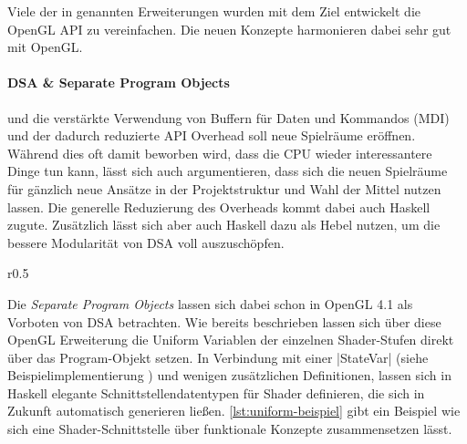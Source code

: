Viele der in  genannten Erweiterungen wurden mit dem Ziel entwickelt die OpenGL API zu vereinfachen. Die neuen Konzepte harmonieren dabei sehr gut mit OpenGL.

\paragraph{\acl{DSA} \& Separate Program Objects} und die verstärkte Verwendung von Buffern für Daten und Kommandos (\ac{MDI}) und der dadurch reduzierte API Overhead soll neue Spielräume eröffnen. Während dies oft damit beworben wird, dass die CPU wieder interessantere Dinge tun kann, lässt sich auch argumentieren, dass sich die neuen Spielräume für gänzlich neue Ansätze in der Projektstruktur und Wahl der Mittel nutzen lassen. Die generelle Reduzierung des Overheads kommt dabei auch Haskell zugute. Zusätzlich lässt sich aber auch Haskell dazu als Hebel nutzen, um die bessere Modularität von \ac{DSA} voll auszuschöpfen.

\begin{wrapfigure}{r}{0.5\linewidth}
\centering
{}
\end{wrapfigure}

Die \textit{Separate Program Objects} lassen sich dabei schon in OpenGL 4.1 als Vorboten von \ac{DSA} betrachten. Wie bereits beschrieben lassen sich über diese OpenGL Erweiterung die Uniform Variablen der einzelnen Shader-Stufen direkt über das Program-Objekt setzen. In Verbindung mit einer |StateVar| (siehe Beispielimplementierung ) und wenigen zusätzlichen Definitionen, lassen sich in Haskell elegante Schnittstellendatentypen für Shader definieren, die sich in Zukunft automatisch generieren ließen. \ref{lst:uniform-beispiel} gibt ein Beispiel wie sich eine Shader-Schnittstelle über funktionale Konzepte zusammensetzen lässt.

\endgroup
